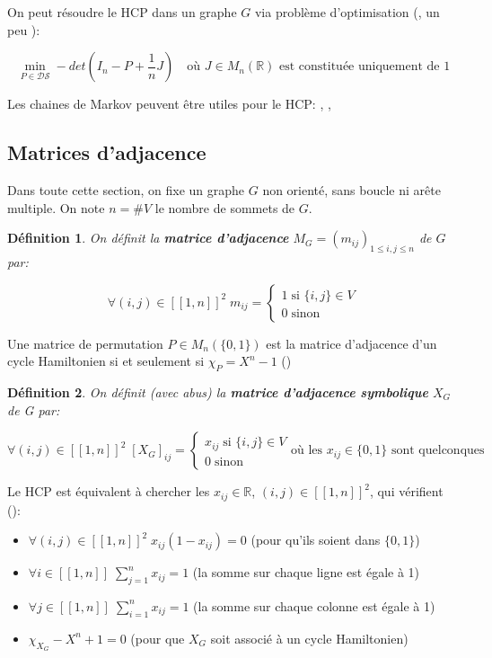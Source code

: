 \documentclass{article}
\newtheorem{definition}{Définition}[section]
\begin{document}
On peut résoudre le HCP dans un graphe $G$  via problème d'optimisation (\cite{Haythorpe2010FindingHC,Ejov2008DeterminantsAL}, un peu \cite{Ejov2009ConsistentBO}):

\[
\min_{P \in \mathcal{D}\mathcal{S}} -det(I_{n}-P+\frac{1}{n}J) \quad \text{où $J \in M_{n}(\mathbb{R})$ est constituée uniquement de 1}
\]

Les chaines de Markov peuvent être utiles pour le HCP: \cite{Haythorpe2013MarkovCB}, \cite{Ejov2009ConsistentBO}, \cite{Filar2007ControlledMC}


\subsection{Matrices d'adjacence}
Dans toute cette section, on fixe un graphe $G$ non orienté, sans boucle ni arête multiple. On note $n=\# V$ le nombre de sommets de $G$.

\begin{definition}
On définit la \textbf{matrice d'adjacence} $M_G=(m_{ij})_{1 \le i,j \le n}$ de $G$ par:

\[
\forall (i,j) \in [\![1,n]\!]^2 \; m_{ij}=
	\begin{cases}
	1 \; \text{si $\{i,j\} \in V$}\\
	0 \; \text{sinon}
	\end{cases}
\]
\end{definition}

Une matrice de permutation $P \in M_{n}(\{0,1\})$ est la matrice d'adjacence d'un cycle Hamiltonien si et seulement si $\chi _{P} = X^{n}-1$ (\cite{Ejov2006SOLVINGTH})

\begin{definition}
On définit (avec abus) la \textbf{matrice d'adjacence symbolique} $X_{G}$ de G par:

\[
\forall (i,j) \in [\![1,n]\!]^2 \; [X_{G}]_{ij}=
	\begin{cases}
	x_{ij} \; \text{si $\{i,j\} \in V$}\\
	0 \; \text{sinon}
	\end{cases}
\text{où les $x_{ij} \in \{0,1\}$ sont quelconques}
\]
\end{definition}

Le HCP est équivalent à chercher les $x_{ij} \in \mathbb{R}$, $(i,j) \in [\![1,n]\!]^2$, qui vérifient (\cite{Ejov2006SOLVINGTH}):

\begin{itemize}
\item $\forall (i,j) \in [\![1,n]\!]^2 \; x_{ij}(1-x_{ij})=0$ \quad (pour qu'ils soient dans $\{0,1\}$)
\item $\forall i \in [\![1,n]\!] \; \sum\limits_{j=1}^{n}x_{ij}=1$ \quad (la somme sur chaque ligne est égale à 1)
\item $\forall j \in [\![1,n]\!] \; \sum\limits_{i=1}^{n}x_{ij}=1$ \quad (la somme sur chaque colonne est égale à 1)
\item $\chi_{X_{G}} - X^{n}+1=0$ \quad (pour que $X_{G}$ soit associé à un cycle Hamiltonien)
\end{itemize}
\end{document}

